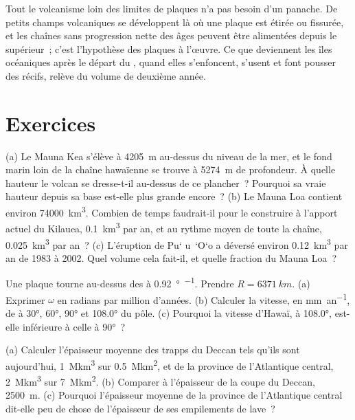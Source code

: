 Tout le volcanisme loin des limites de plaques n'a pas besoin d'un panache. De petits
champs volcaniques se développent là où une plaque est étirée ou fissurée, et les chaînes sans
progression nette des âges peuvent être alimentées depuis le  supérieur~; c'est l'hypothèse des
plaques à l'œuvre. Ce que deviennent les îles océaniques après le départ du ,
quand elles s'enfoncent, s'usent et font pousser des récifs, relève du volume de deuxième année.

\section{Exercices}

\begin{exercise}[$\star$]\label{exo:b1:hotspots:1}
(a) Le Mauna Kea s'élève à \qty{4205}{m} au-dessus du niveau de la mer, et le fond marin loin de
la chaîne hawaïenne se trouve à \qty{5274}{m} de profondeur. À quelle hauteur le volcan se dresse-t-il
au-dessus de ce plancher~? Pourquoi sa vraie hauteur depuis sa base est-elle plus grande encore~?
(b) Le Mauna Loa contient environ \qty{74000}{km^3}. Combien de temps faudrait-il pour le construire
à l'apport actuel du Kilauea, \qty{0.1}{km^3} par an, et au rythme moyen de
toute la chaîne, \qty{0.025}{km^3} par an~? (c) L'éruption de Pu\textquoteleft
u~\textquoteleft O\textquoteleft o a déversé environ \qty{0.12}{km^3}
par an de 1983 à 2002. Quel volume cela fait-il, et quelle fraction du Mauna Loa~?
\end{exercise}

\begin{exercise}[$\star$]\label{exo:b1:hotspots:2}
Une plaque tourne au-dessus des  à \qty{0.92}{\degree\per\Ma}. Prendre
$R = \qty{6371}{km}$. (a) Exprimer $\omega$ en radians par million d'années. (b)
Calculer la vitesse, en \unit{mm.an^{-1}}, de  à \ang{30}, \ang{60},
\ang{90} et \ang{108.0} du pôle. (c) Pourquoi la vitesse d'Hawaï, à
\ang{108.0}, est-elle inférieure à celle à \ang{90}~?
\end{exercise}

\begin{exercise}[$\star$]\label{exo:b1:hotspots:3}
(a) Calculer l'épaisseur moyenne des trapps du Deccan tels qu'ils sont aujourd'hui,
\qty{1}{\mega km^3} sur \qty{0.5}{\mega km^2}, et de la province de l'Atlantique
central, \qty{2}{\mega km^3} sur \qty{7}{\mega km^2}. (b) Comparer à
l'épaisseur de la coupe du Deccan, \qty{2500}{m}. (c) Pourquoi l'épaisseur moyenne
de la province de l'Atlantique central dit-elle peu de chose de l'épaisseur de
ses empilements de lave~?
\end{exercise}

